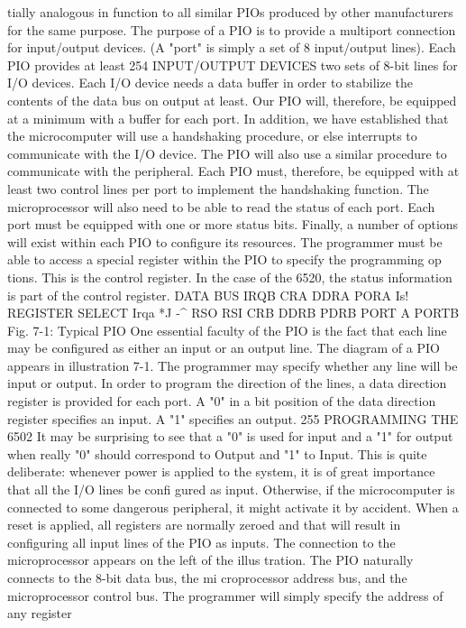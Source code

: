 tially analogous in function to all similar PIOs produced by other
manufacturers for the same purpose. The purpose of a PIO is to
provide a multiport connection for input/output devices. (A "port"
is simply a set of 8 input/output lines). Each PIO provides at least
254
INPUT/OUTPUT DEVICES
two sets of 8-bit lines for I/O devices. Each I/O device needs a data
buffer in order to stabilize the contents of the data bus on output
at least. Our PIO will, therefore, be equipped at a minimum with
a buffer for each port.
In addition, we have established that the microcomputer will
use a handshaking procedure, or else interrupts to communicate
with the I/O device. The PIO will also use a similar procedure to
communicate with the peripheral. Each PIO must, therefore, be
equipped with at least two control lines per port to implement the
handshaking function.
The microprocessor will also need to be able to read the status
of each port. Each port must be equipped with one or more status
bits. Finally, a number of options will exist within each PIO to
configure its resources. The programmer must be able to access a
special register within the PIO to specify the programming op
tions. This is the control register. In the case of the 6520, the
status information is part of the control register.
DATA BUS
IRQB
CRA DDRA PORA
Is!
REGISTER
SELECT
Irqa
*J
-^
RSO
RSI
CRB DDRB PDRB
PORT A
PORTB
Fig. 7-1: Typical PIO
One essential faculty of the PIO is the fact that each line may
be configured as either an input or an output line. The diagram of
a PIO appears in illustration 7-1. The programmer may specify
whether any line will be input or output. In order to program the
direction of the lines, a data direction register is provided for each
port. A "0" in a bit position of the data direction register specifies
an input. A "1" specifies an output.
255
PROGRAMMING THE 6502
It may be surprising to see that a "0" is used for input and a "1"
for output when really "0" should correspond to Output and "1" to
Input. This is quite deliberate: whenever power is applied to the
system, it is of great importance that all the I/O lines be confi
gured as input. Otherwise, if the microcomputer is connected to
some dangerous peripheral, it might activate it by accident.
When a reset is applied, all registers are normally zeroed and that
will result in configuring all input lines of the PIO as inputs. The
connection to the microprocessor appears on the left of the illus
tration. The PIO naturally connects to the 8-bit data bus, the mi
croprocessor address bus, and the microprocessor control bus.
The programmer will simply specify the address of any register
